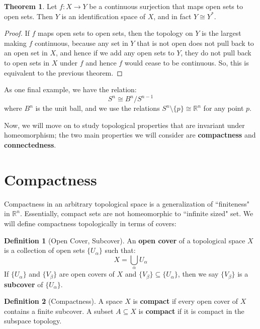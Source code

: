\documentclass[11pt, oneside]{amsart}   	%
\theoremstyle{definition}
\newtheorem{definition}{Definition}[section]
\newtheorem{theorem}{Theorem}[section]
\begin{document}
	\begin{theorem}
		Let $f : X\rightarrow Y$ be a continuous surjection that maps open sets to open sets. Then $Y$ is an identification space of $X$, and in fact $Y\cong 
		Y^*$. 
	\end{theorem}
	
	\begin{proof}
		If $f$ maps open sets to open sets, then the topology on $Y$ is the largest making $f$ continuous, because any set in $Y$ that is not open does 
		not pull back to an open set in $X$, and hence if we add any open sets to $Y$, they do not pull back to open sets in $X$ under $f$ and hence 
		$f$ would cease to be continuous. So, this is equivalent to the previous theorem. 
	\end{proof}
	
	As one final example, we have the relation:
	$$
		S^n\cong B^n / S^{n - 1}
	$$
	where $B^n$ is the unit ball, and we use the relations $S^n\setminus\{p\}\cong \mathbb R^n$ for any point $p$.

	Now, we will move on to study topological properties that are invariant under homeomorphism; the two main properties 
	we will consider are \textbf{compactness} and \textbf{connectedness}.

\newpage

\section{Compactness}
	
	Compactness in an arbitrary topological space is a generalization of ``finiteness" in $\mathbb R^n$. Essentially, compact 
	sets are not homeomorphic to ``infinite sized" set. We will define compactness topologically in terms of covers:
	
	\begin{definition}[Open Cover, Subcover]
		An \textbf{open cover} of a topological space $X$ is a collection of open sets $\{U_\alpha\}$ such that:
		$$
			X = \bigcup_\alpha U_\alpha
		$$
		If $\{U_\alpha\}$ and $\{V_\beta\}$ are open covers of $X$ and $\{V_\beta\}\subseteq\{U_\alpha\}$, then we say 
		$\{V_\beta\}$ is a \textbf{subcover} of $\{U_\alpha\}$.
	\end{definition}
	
	\begin{definition}[Compactness]
		A space $X$ is \textbf{compact} if every open cover of $X$ contains a finite subcover. A subset $A\subseteq X$ is 
		\textbf{compact} if it is compact in the subspace topology. 
	\end{definition}
	
\end{document}
